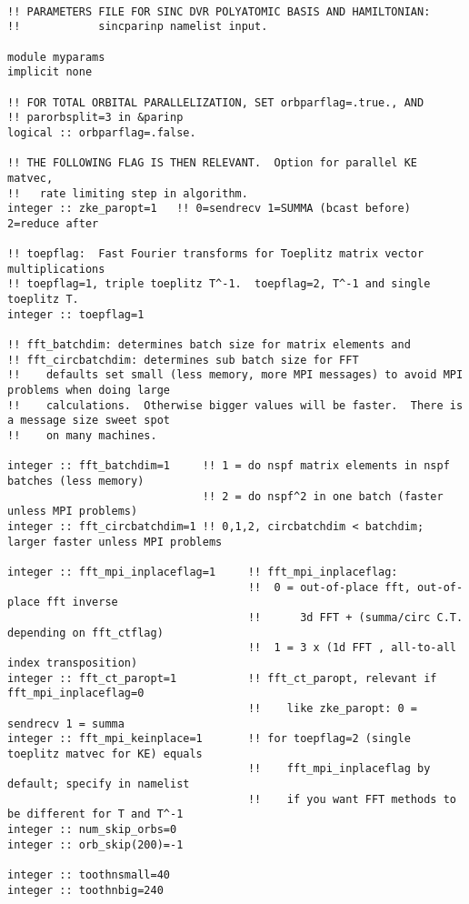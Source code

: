 \begin{verbatim}

!! PARAMETERS FILE FOR SINC DVR POLYATOMIC BASIS AND HAMILTONIAN:
!!            sincparinp namelist input.

module myparams
implicit none

!! FOR TOTAL ORBITAL PARALLELIZATION, SET orbparflag=.true., AND
!! parorbsplit=3 in &parinp
logical :: orbparflag=.false.

!! THE FOLLOWING FLAG IS THEN RELEVANT.  Option for parallel KE matvec,
!!   rate limiting step in algorithm.
integer :: zke_paropt=1   !! 0=sendrecv 1=SUMMA (bcast before) 2=reduce after

!! toepflag:  Fast Fourier transforms for Toeplitz matrix vector multiplications
!! toepflag=1, triple toeplitz T^-1.  toepflag=2, T^-1 and single toeplitz T. 
integer :: toepflag=1

!! fft_batchdim: determines batch size for matrix elements and 
!! fft_circbatchdim: determines sub batch size for FFT 
!!    defaults set small (less memory, more MPI messages) to avoid MPI problems when doing large 
!!    calculations.  Otherwise bigger values will be faster.  There is a message size sweet spot
!!    on many machines.

integer :: fft_batchdim=1     !! 1 = do nspf matrix elements in nspf batches (less memory)
                              !! 2 = do nspf^2 in one batch (faster unless MPI problems)
integer :: fft_circbatchdim=1 !! 0,1,2, circbatchdim < batchdim; larger faster unless MPI problems

integer :: fft_mpi_inplaceflag=1     !! fft_mpi_inplaceflag:
                                     !!  0 = out-of-place fft, out-of-place fft inverse
                                     !!      3d FFT + (summa/circ C.T. depending on fft_ctflag)
                                     !!  1 = 3 x (1d FFT , all-to-all index transposition)
integer :: fft_ct_paropt=1           !! fft_ct_paropt, relevant if fft_mpi_inplaceflag=0
                                     !!    like zke_paropt: 0 = sendrecv 1 = summa
integer :: fft_mpi_keinplace=1       !! for toepflag=2 (single toeplitz matvec for KE) equals 
                                     !!    fft_mpi_inplaceflag by default; specify in namelist
                                     !!    if you want FFT methods to be different for T and T^-1
integer :: num_skip_orbs=0
integer :: orb_skip(200)=-1

integer :: toothnsmall=40
integer :: toothnbig=240


\end{verbatim}
